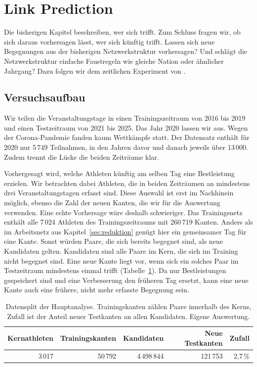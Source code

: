 \section{Link Prediction}
\label{sec:link_prediction}

Die bisherigen Kapitel beschreiben, wer sich trifft. Zum Schluss fragen wir,
ob sich daraus vorhersagen lässt, wer sich künftig trifft. Lassen sich neue
Begegnungen aus der bisherigen Netzwerkstruktur vorhersagen? Und schlägt die
Netzwerkstruktur einfache Faustregeln wie gleiche Nation oder ähnlicher
Jahrgang? Dazu folgen wir dem zeitlichen Experiment von
\textcite{libenNowellKleinberg2007}.

\subsection{Versuchsaufbau}
Wir teilen die Veranstaltungstage in einen Trainingszeitraum von 2016 bis
2019 und einen Testzeitraum von 2021 bis 2025. Das Jahr 2020 lassen wir aus.
Wegen der Corona-Pandemie fanden kaum Wettkämpfe statt. Der Datensatz
enthält für 2020 nur 5\,749 Teilnahmen, in den Jahren davor und danach
jeweils über 13\,000. Zudem trennt die Lücke die beiden Zeiträume klar.

Vorhergesagt wird, welche Athleten künftig am selben Tag eine Bestleistung erzielen. Wir betrachten dabei Athleten, die in beiden Zeiträumen an mindestens drei Veranstaltungstagen erfasst sind. Diese Auswahl ist erst
im Nachhinein möglich, ebenso die Zahl der neuen Kanten, die wir für die
Auswertung verwenden. Eine echte Vorhersage wäre deshalb schwieriger. Das Trainingsnetz enthält alle 7\,024 Athleten des
Trainingszeitraums mit 260\,719 Kanten. Anders als im Arbeitsnetz aus
Kapitel~\ref{sec:reduktion} genügt hier ein gemeinsamer Tag für eine Kante.
Sonst würden Paare, die sich bereits begegnet sind, als neue Kandidaten
gelten. Kandidaten sind alle Paare im Kern, die sich im Training nicht
begegnet sind. Eine neue Kante liegt vor, wenn sich ein solches Paar im
Testzeitraum mindestens einmal trifft (Tabelle~\ref{tab:link_prediction_split}).
Da nur Bestleistungen gespeichert sind und eine Verbesserung den früheren
Tag ersetzt, kann eine neue Kante auch eine frühere, nicht mehr erfasste
Begegnung sein.

\begin{table}[H]
  \centering
  \caption{Datensplit der Hauptanalyse. Trainingskanten zählen Paare
  innerhalb des Kerns, Zufall ist der Anteil neuer Testkanten an allen
  Kandidaten. Eigene Auswertung.}
  \label{tab:link_prediction_split}
  \small
  \begin{tabular}{@{}rrrrr@{}}
    \toprule
    Kernathleten & Trainingskanten & Kandidaten & Neue Testkanten & Zufall \\
    \midrule
    3\,017 & 50\,792 & 4\,498\,844 & 121\,753 & 2,7\,\% \\
    \bottomrule
  \end{tabular}
\end{table}

